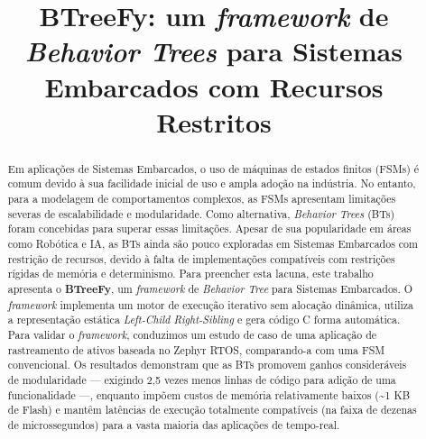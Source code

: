 \documentclass[conference]{IEEEtran}
\begin{document}
\title{BTreeFy: um \textit{framework} de \textit{Behavior Trees} para Sistemas Embarcados com Recursos Restritos}

\author{
\and
{}
\and
{}
}

\maketitle

\begin{abstract}
Em aplicações de Sistemas Embarcados, o uso de máquinas de estados finitos (FSMs) é comum devido à sua facilidade inicial de uso e ampla adoção na indústria. No entanto, para a modelagem de comportamentos complexos, as FSMs apresentam limitações severas de escalabilidade e modularidade. Como alternativa, \textit{Behavior Trees} (BTs) foram concebidas para superar essas limitações. Apesar de sua popularidade em áreas como Robótica e IA, as BTs ainda são pouco exploradas em Sistemas Embarcados com restrição de recursos, devido à falta de implementações compatíveis com restrições rígidas de memória e determinismo. Para preencher esta lacuna, este trabalho apresenta o \textbf{BTreeFy}, um \textit{framework} de \textit{Behavior Tree} para Sistemas Embarcados. O \textit{framework} implementa um motor de execução iterativo sem alocação dinâmica, utiliza a representação estática \textit{Left-Child Right-Sibling} e gera código C forma automática. Para validar o \textit{framework}, conduzimos um estudo de caso de uma aplicação de rastreamento de ativos baseada no Zephyr RTOS, comparando-a com uma FSM convencional. Os resultados demonstram que as BTs promovem ganhos consideráveis de modularidade — exigindo 2,5 vezes menos linhas de código para adição de uma funcionalidade —, enquanto impõem custos de memória relativamente baixos (\textasciitilde 1 KB de Flash) e mantêm latências de execução totalmente compatíveis (na faixa de dezenas de microssegundos) para a vasta maioria das aplicações de tempo-real.
\end{abstract}
\end{document}
